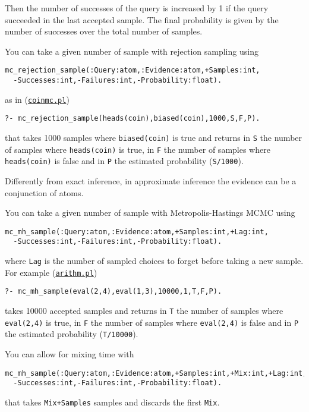 Then the number of successes of the query is increased by 1 if the query succeeded in the last accepted
sample. The final probability is given by the number of successes over the total 
number of samples.

You can take a given number of sample with rejection sampling using
\begin{verbatim}
mc_rejection_sample(:Query:atom,:Evidence:atom,+Samples:int,
  -Successes:int,-Failures:int,-Probability:float).
\end{verbatim}
as in (\href{http://cplint.lamping.unife.it/example/inference/coinmc.pl}{\texttt{coinmc.pl}})
\begin{verbatim}
?- mc_rejection_sample(heads(coin),biased(coin),1000,S,F,P).
\end{verbatim}
that takes 1000 samples where \verb|biased(coin)| is true and returns in \verb|S| the number of samples where 
\verb|heads(coin)| is true, in \verb|F| the number of samples where \verb|heads(coin)| is false and in \verb|P| the
estimated probability (\verb|S/1000|).

Differently from exact inference, in approximate inference the evidence can be a conjunction of atoms.

You can take a given number of sample with Metropolis-Hastings MCMC using
\begin{verbatim}
mc_mh_sample(:Query:atom,:Evidence:atom,+Samples:int,+Lag:int,
  -Successes:int,-Failures:int,-Probability:float).
\end{verbatim}
where \verb|Lag| is the number of sampled choices to forget before taking a new sample.
For example (\href{http://cplint.lamping.unife.it/example/inference/arithm.pl}{\texttt{arithm.pl}})
\begin{verbatim}
?- mc_mh_sample(eval(2,4),eval(1,3),10000,1,T,F,P).
\end{verbatim}
takes 10000 accepted samples and returns in \verb|T| the number of samples where 
\verb|eval(2,4)| is true, in \verb|F| the number of samples where \verb|eval(2,4)| is false and in \verb|P| the
estimated probability (\verb|T/10000|).

You can allow for mixing time with
\begin{verbatim}
mc_mh_sample(:Query:atom,:Evidence:atom,+Samples:int,+Mix:int,+Lag:int,
  -Successes:int,-Failures:int,-Probability:float).
\end{verbatim}
that takes \verb|Mix+Samples| samples and discards the first \verb|Mix|.


